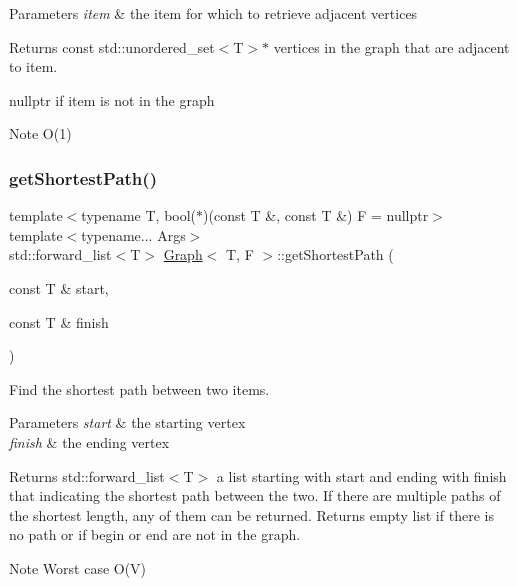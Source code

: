 \begin{DoxyParams}{Parameters}
{\em item} & the item for which to retrieve adjacent vertices \\
\hline
\end{DoxyParams}
\begin{DoxyReturn}{Returns}
const std\+::unordered\+\_\+set$<$\+T$>$$\ast$ vertices in the graph that are adjacent to item. 

nullptr if item is not in the graph
\end{DoxyReturn}
\begin{DoxyNote}{Note}
O(1) 
\end{DoxyNote}
\mbox{\label{class_graph_a8d04a41dc37e5d4604f8ae546fbdfca9}} 
\subsubsection{\texorpdfstring{get\+Shortest\+Path()}{getShortestPath()}\hspace{0.1cm}{\footnotesize\ttfamily [1/2]}}
{\footnotesize\ttfamily template$<$typename T, bool($\ast$)(const T \&, const T \&) F = nullptr$>$ \\
template$<$typename... Args$>$ \\
std\+::forward\+\_\+list$<$T$>$ \hyperlink{class_graph}{Graph}$<$ T, F $>$\+::get\+Shortest\+Path (\begin{DoxyParamCaption}\item[{const T \&}]{start,  }\item[{const T \&}]{finish }\end{DoxyParamCaption})}



Find the shortest path between two items. 


\begin{DoxyParams}{Parameters}
{\em start} & the starting vertex \\
\hline
{\em finish} & the ending vertex \\
\hline
\end{DoxyParams}
\begin{DoxyReturn}{Returns}
std\+::forward\+\_\+list$<$\+T$>$ a list starting with start and ending with finish that indicating the shortest path between the two. If there are multiple paths of the shortest length, any of them can be returned. Returns empty list if there is no path or if begin or end are not in the graph.
\end{DoxyReturn}
\begin{DoxyNote}{Note}
Worst case O(\+V) 
\end{DoxyNote}
\mbox{\label{class_graph_a8b2f84e77b6fffbea0c4581524c8d04d}} 
